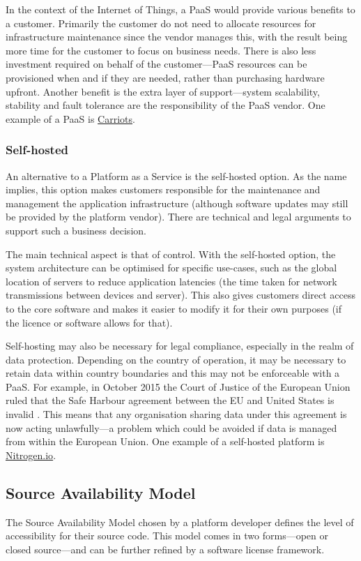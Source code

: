        In the context of the Internet of Things, a PaaS would provide various benefits to a customer. Primarily the customer do not need to allocate resources for infrastructure maintenance since the vendor manages this, with the result being more time for the customer to focus on business needs. There is also less investment required on behalf of the customer---PaaS resources can be provisioned when and if they are needed, rather than purchasing hardware upfront. Another benefit is the extra layer of support---system scalability, stability and fault tolerance are the responsibility of the PaaS vendor. One example of a PaaS is \href{https://www.carriots.com/}{Carriots}.

      \subsubsection{Self-hosted}
        An alternative to a Platform as a Service is the self-hosted option. As the name implies, this option makes customers responsible for the maintenance and management the application infrastructure (although software updates may still be provided by the platform vendor). There are technical and legal arguments to support such a business decision.

        The main technical aspect is that of control. With the self-hosted option, the system architecture can be optimised for specific use-cases, such as the global location of servers to reduce application latencies (the time taken for network transmissions between devices and server). This also gives customers direct access to the core software and makes it easier to modify it for their own purposes (if the licence or software allows for that).

        Self-hosting may also be necessary for legal compliance, especially in the realm of data protection. Depending on the country of operation, it may be necessary to retain data within country boundaries and this may not be enforceable with a PaaS. For example, in October 2015 the Court of Justice of the European Union ruled that the Safe Harbour agreement between the EU and United States is invalid \citep{C362/14}. This means that any organisation sharing data under this agreement is now acting unlawfully---a problem which could be avoided if data is managed from within the European Union. One example of a self-hosted platform is \href{http://nitrogen.io/}{Nitrogen.io}.

    \subsection{Source Availability Model}
      The Source Availability Model chosen by a platform developer defines the level of accessibility for their source code. This model comes in two forms---open or closed source---and can be further refined by a software license framework.

